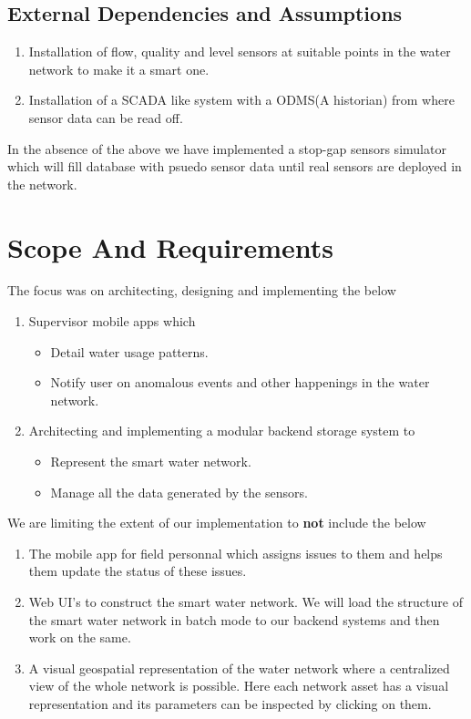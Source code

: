 \documentclass[11pt]{report} %
\begin{document}
\section{External Dependencies and Assumptions}
\begin{enumerate}
\item
Installation of flow, quality and level sensors at suitable points in the water network to make it a smart one. 
\item
Installation of a SCADA like system with a ODMS(A historian) from where sensor data can be read off.
\end{enumerate}
In the absence of the above we have implemented a stop-gap sensors simulator which will fill database with psuedo sensor data until real sensors are deployed in the network.


\chapter{Scope And Requirements}

The focus was on architecting, designing and implementing the below
\begin{enumerate}
\item
Supervisor mobile apps which
\begin{itemize}
\item
Detail water usage patterns.
\item
Notify user on anomalous events and other happenings in the water network.
\end{itemize}
\item
Architecting and implementing a modular backend storage system to
\begin{itemize}
\item
Represent the smart water network.
\item
Manage all the data generated by the sensors.\\
\end{itemize}
\end{enumerate}
We are limiting the extent of our implementation to \textbf{not} include the below
\begin{enumerate}
\item
The mobile app for field personnal which assigns issues to them and helps them update the status of these issues.
\item
Web UI's to construct the smart water network. We will load the structure of the smart water network in batch mode to our backend systems and then work on the same.
\item
A visual geospatial representation of the water network where a centralized view of the whole network is possible. Here each network asset has a visual representation and its parameters can be inspected by clicking on them.
\end{enumerate}
\end{document}

